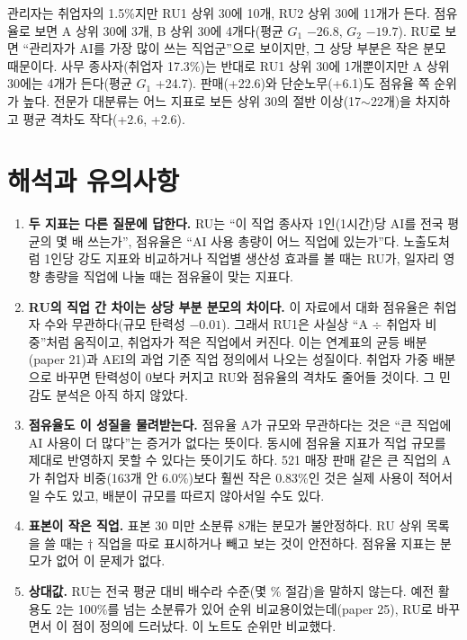 \documentclass[11pt]{article}
\begin{document}
관리자는 취업자의 1.5\%지만 RU1 상위 30에 10개, RU2 상위 30에 11개가 든다. 점유율로 보면 A 상위 30에 3개, B 상위 30에 4개다(평균 $G_1$ $-26.8$, $G_2$ $-19.7$). RU로 보면 ``관리자가 AI를 가장 많이 쓰는 직업군''으로 보이지만, 그 상당 부분은 작은 분모 때문이다. 사무 종사자(취업자 17.3\%)는 반대로 RU1 상위 30에 1개뿐이지만 A 상위 30에는 4개가 든다(평균 $G_1$ +24.7). 판매(+22.6)와 단순노무(+6.1)도 점유율 쪽 순위가 높다. 전문가 대분류는 어느 지표로 보든 상위 30의 절반 이상(17$\sim$22개)을 차지하고 평균 격차도 작다(+2.6, +2.6).

\section{해석과 유의사항}

\begin{enumerate}[leftmargin=*]
  \item \textbf{두 지표는 다른 질문에 답한다.} RU는 ``이 직업 종사자 1인(1시간)당 AI를 전국 평균의 몇 배 쓰는가'', 점유율은 ``AI 사용 총량이 어느 직업에 있는가''다. 노출도처럼 1인당 강도 지표와 비교하거나 직업별 생산성 효과를 볼 때는 RU가, 일자리 영향 총량을 직업에 나눌 때는 점유율이 맞는 지표다.
  \item \textbf{RU의 직업 간 차이는 상당 부분 분모의 차이다.} 이 자료에서 대화 점유율은 취업자 수와 무관하다(규모 탄력성 $-0.01$). 그래서 RU1은 사실상 ``A $\div$ 취업자 비중''처럼 움직이고, 취업자가 적은 직업에서 커진다. 이는 연계표의 균등 배분(paper 21)과 AEI의 과업 기준 직업 정의에서 나오는 성질이다. 취업자 가중 배분으로 바꾸면 탄력성이 0보다 커지고 RU와 점유율의 격차도 줄어들 것이다. 그 민감도 분석은 아직 하지 않았다.
  \item \textbf{점유율도 이 성질을 물려받는다.} 점유율 A가 규모와 무관하다는 것은 ``큰 직업에 AI 사용이 더 많다''는 증거가 없다는 뜻이다. 동시에 점유율 지표가 직업 규모를 제대로 반영하지 못할 수 있다는 뜻이기도 하다. 521 매장 판매 같은 큰 직업의 A가 취업자 비중(163개 안 6.0\%)보다 훨씬 작은 0.83\%인 것은 실제 사용이 적어서일 수도 있고, 배분이 규모를 따르지 않아서일 수도 있다.
  \item \textbf{표본이 작은 직업.} 표본 30 미만 소분류 8개는 분모가 불안정하다. RU 상위 목록을 쓸 때는 $\dagger$ 직업을 따로 표시하거나 빼고 보는 것이 안전하다. 점유율 지표는 분모가 없어 이 문제가 없다.
  \item \textbf{상대값.} RU는 전국 평균 대비 배수라 수준(몇 \% 절감)을 말하지 않는다. 예전 활용도 2는 100\%를 넘는 소분류가 있어 순위 비교용이었는데(paper 25), RU로 바꾸면서 이 점이 정의에 드러났다. 이 노트도 순위만 비교했다.
\end{enumerate}
\end{document}
